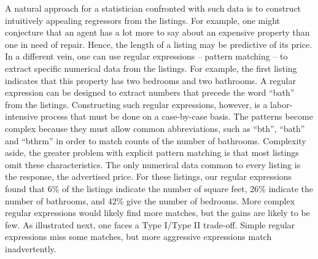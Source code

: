 \documentclass[12pt]{article}
\begin{document}
  
 A natural approach for a statistician confronted with such data is to construct
 intuitively appealing regressors from the listings.  For example, one might
 conjecture that an agent has a lot more to say about an expensive property than
 one in need of repair.  Hence, the length of a listing 
 may be predictive of its price.  In a different vein, one can use regular
 expressions -- pattern matching -- to extract specific numerical data from the
 listings.  For example, the first listing indicates that this property has two
 bedrooms and two bathrooms.  A regular expression can be designed to extract
 numbers that precede the word ``bath'' from the listings.  Constructing such
 regular expressions, however, is a labor-intensive process that must be done on
 a case-by-case basis.  The patterns become complex because they must allow
 common abbreviations, such as ``bth'', ``bath'' and ``bthrm'' in order to match
 counts of the number of bathrooms.  Complexity aside, the greater problem with
 explicit pattern matching is that most listings omit these characteristics.
  The only numerical data common to every listing is the response, the
 advertised price.  For these listings, our regular expressions found that 6\%
 of the listings indicate the number of square feet, 26\% indicate the number of
 bathrooms, and 42\% give the number of bedrooms.  More complex regular
 expressions would likely find more matches, but the gains are likely to be few.
  As illustrated next, one faces a Type I/Type II trade-off.  Simple
 regular expressions miss some matches, but more aggressive expressions match
 inadvertently.
\end{document}
